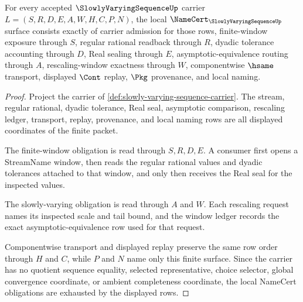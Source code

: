 \begin{theorem}
\label{thm:slowly-varying-sequence-namecert-obligations}
For every accepted $\SlowlyVaryingSequenceUp$ carrier $L=(S,R,D,E,A,W,H,C,P,N)$, the local $\NameCert_{\SlowlyVaryingSequenceUp}$ surface consists exactly of carrier admission for those rows, finite-window exposure through $S$, regular rational readback through $R$, dyadic tolerance accounting through $D$, Real sealing through $E$, asymptotic-equivalence routing through $A$, rescaling-window exactness through $W$, componentwise $\hsame$ transport, displayed $\Cont$ replay, $\Pkg$ provenance, and local naming.
\end{theorem}
\begin{proof}
Project the carrier of \autoref{def:slowly-varying-sequence-carrier}. The stream, regular rational, dyadic tolerance, Real seal, asymptotic comparison, rescaling ledger, transport, replay, provenance, and local naming rows are all displayed coordinates of the finite packet.

The finite-window obligation is read through $S,R,D,E$. A consumer first opens a StreamName window, then reads the regular rational values and dyadic tolerances attached to that window, and only then receives the Real seal for the inspected values.

The slowly-varying obligation is read through $A$ and $W$. Each rescaling request names its inspected scale and tail bound, and the window ledger records the exact asymptotic-equivalence row used for that request.

Componentwise transport and displayed replay preserve the same row order through $H$ and $C$, while $P$ and $N$ name only this finite surface. Since the carrier has no quotient sequence equality, selected representative, choice selector, global convergence coordinate, or ambient completeness coordinate, the local NameCert obligations are exhausted by the displayed rows.
\end{proof}


